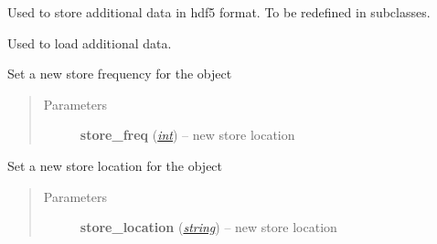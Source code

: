 \documentclass[a4paper,10pt,english]{sphinxmanual}
\begin{document}
\begin{fulllineitems}

\begin{fulllineitems}
\label{api-core:TensorToolbox.core.storable_object.h5store}
Used to store additional data in hdf5 format. To be redefined in subclasses.

\end{fulllineitems}


\begin{fulllineitems}
\label{api-core:TensorToolbox.core.storable_object.load}
Used to load additional data.

\end{fulllineitems}


\begin{fulllineitems}
\label{api-core:TensorToolbox.core.storable_object.set_store_freq}
Set a new store frequency for the object
\begin{quote}\begin{description}
\item[{Parameters}] \leavevmode
\textbf{store\_freq} (\href{http://docs.python.org/library/functions.html\#int}{\emph{int}}) -- new store location

\end{description}\end{quote}

\end{fulllineitems}


\begin{fulllineitems}
\label{api-core:TensorToolbox.core.storable_object.set_store_location}
Set a new store location for the object
\begin{quote}\begin{description}
\item[{Parameters}] \leavevmode
\textbf{store\_location} (\href{http://docs.python.org/library/string.html\#module-string}{\emph{string}}) -- new store location


\end{description}
\end{quote}
\end{fulllineitems}
\end{fulllineitems}
\end{document}
